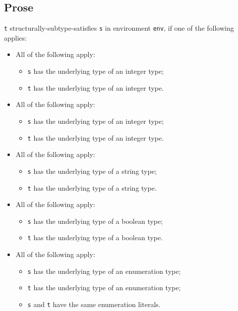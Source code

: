 \documentclass{book}
\newcommand\tenv[0]{\texttt{env}}
\begin{document}
\subsection{Prose}
\texttt{t} structurally-subtype-satisfies \texttt{s} in environment \tenv, if one of the following applies:
  \begin{itemize}
  \item All of the following apply:
    \begin{itemize}
    \item \texttt{s} has the underlying type of an integer type;
    \item \texttt{t} has the underlying type of an integer type.
    \end{itemize}

  \item All of the following apply:
    \begin{itemize}
    \item \texttt{s} has the underlying type of an integer type;
    \item \texttt{t} has the underlying type of an integer type.
    \end{itemize}

  \item All of the following apply:
    \begin{itemize}
    \item \texttt{s} has the underlying type of a string type;
    \item \texttt{t} has the underlying type of a string type.
    \end{itemize}

  \item All of the following apply:
    \begin{itemize}
    \item \texttt{s} has the underlying type of a boolean type;
    \item \texttt{t} has the underlying type of a boolean type.
    \end{itemize}

  \item All of the following apply:
    \begin{itemize}
    \item \texttt{s} has the underlying type of an enumeration type;
    \item \texttt{t} has the underlying type of an enumeration type;
    \item \texttt{s} and \texttt{t} have the same enumeration literals.
   \end{itemize}


\end{itemize}
\end{document}
